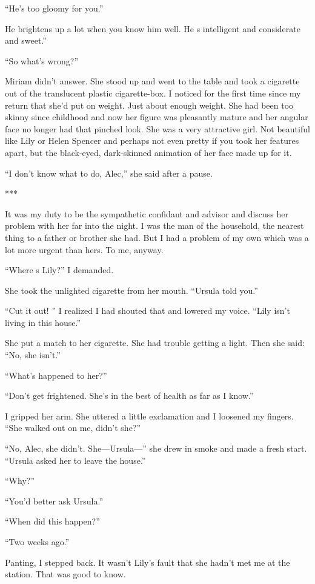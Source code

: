 {“He’s too gloomy for you.”

He brightens up a lot when you know him well. He s intelligent and considerate and sweet.”

“So what’s wrong?”

Miriam didn’t answer. She stood up and went to the table and took a cigarette out of the translucent plastic cigarette-box. I noticed for the first time since my return that she’d put on weight. Just about enough weight. She had been too skinny since childhood and now her figure was pleasantly mature and her angular face no longer had that pinched look. She was a very attractive girl. Not beautiful like Lily or Helen Spencer and perhaps not even pretty if you took her features apart, but the black-eyed, dark-skinned animation of her face made up for it.

“I don’t know what to do, Alec,” she said after a pause.

***

It was my duty to be the sympathetic confidant and advisor and discuss her problem with her far into the night. I was the man of the household, the nearest thing to a father or brother she had. But I had a problem of my own which was a lot more urgent than hers. To me, anyway.

“Where s Lily?” I demanded.

She took the unlighted cigarette from her mouth. “Ursula told you.”

“Cut it out! ” I realized I had shouted that and lowered my voice. “Lily isn’t living in this house.”

She put a match to her cigarette. She had trouble getting a light. Then she said: “No, she isn’t.”

“What’s happened to her?”

“Don’t get frightened. She’s in the best of health as far as I know.”

I gripped her arm. She uttered a little exclamation and I loosened my fingers. “She walked out on me, didn’t she?”

“No, Alec, she didn’t. She—Ursula—” she drew in smoke and made a fresh start. “Ursula asked her to leave the house.”

“Why?”

“You’d better ask Ursula.”

“When did this happen?”

“Two weeks ago.”

Panting, I stepped back. It wasn’t Lily’s fault that she hadn’t met me at the station. That was good to know.

}
